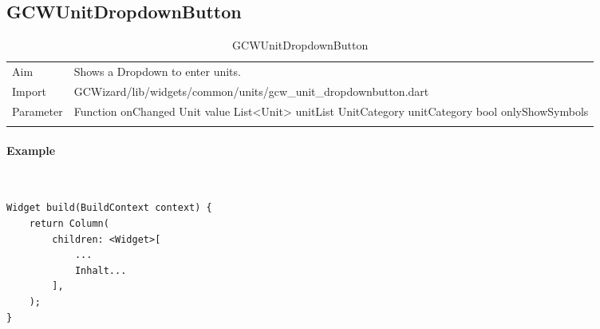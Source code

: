 \subsection{GCWUnitDropdownButton}
\label{fig: GCWUnitDropdownButton}
\begin{table}[H]
\begin{tabular}[h]{p{2cm}p{9cm}}
    \caption{GCWUnitDropdownButton}
    Aim       & Shows a Dropdown to enter units.\\
    Import    & GCWizard/lib/widgets/common/units/gcw\_unit\_dropdownbutton.dart\\
    Parameter & Function onChanged\newline
                Unit value\newline
                List<Unit> unitList\newline
                UnitCategory unitCategory\newline
                bool onlyShowSymbols\\
    \label{tab:GCWUnitDropdownButton}
\end{tabular}
\end{table}
\paragraph*{Example} \,
\begin{lstlisting}
Widget build(BuildContext context) {
    return Column(
        children: <Widget>[
            ...
            Inhalt...
        ],
    );
}
\end{lstlisting}
\label{fig: ExampleGCWUnitDropdownButton}

\newpage
